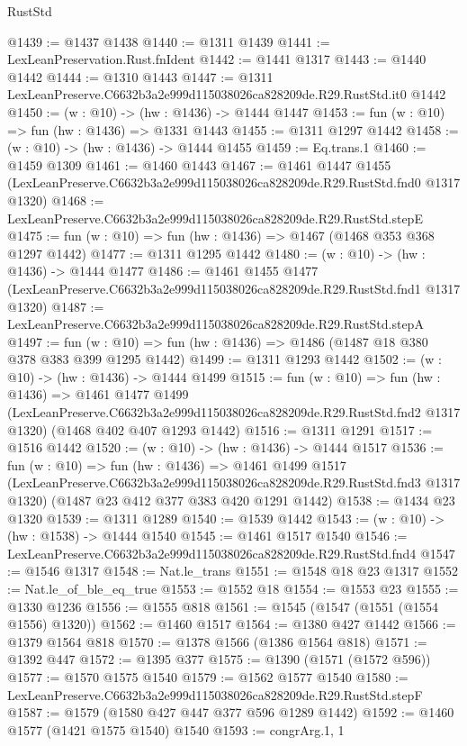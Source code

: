\begin{lexlean}{RustStd}
\begin{coremodule}
@1439 := @1437 @1438
@1440 := @1311 @1439
@1441 := LexLeanPreservation.Rust.fnIdent
@1442 := @1441 @1317
@1443 := @1440 @1442
@1444 := @1310 @1443
@1447 := @1311 LexLeanPreserve.C6632b3a2e999d115038026ca828209de.R29.RustStd.it0 @1442
@1450 := (w : @10) -> (hw : @1436) -> @1444 @1447
@1453 := fun (w : @10) => fun (hw : @1436) => @1331 @1443
@1455 := @1311 @1297 @1442
@1458 := (w : @10) -> (hw : @1436) -> @1444 @1455
@1459 := Eq.trans.{1}
@1460 := @1459 @1309
@1461 := @1460 @1443
@1467 := @1461
    @1447
    @1455
    (LexLeanPreserve.C6632b3a2e999d115038026ca828209de.R29.RustStd.fnd0 @1317 @1320)
@1468 := LexLeanPreserve.C6632b3a2e999d115038026ca828209de.R29.RustStd.stepE
@1475 := fun (w : @10) => fun (hw : @1436) => @1467 (@1468 @353 @368 @1297 @1442)
@1477 := @1311 @1295 @1442
@1480 := (w : @10) -> (hw : @1436) -> @1444 @1477
@1486 := @1461
    @1455
    @1477
    (LexLeanPreserve.C6632b3a2e999d115038026ca828209de.R29.RustStd.fnd1 @1317 @1320)
@1487 := LexLeanPreserve.C6632b3a2e999d115038026ca828209de.R29.RustStd.stepA
@1497 := fun (w : @10) => fun (hw : @1436) => @1486 (@1487 @18 @380 @378 @383 @399 @1295 @1442)
@1499 := @1311 @1293 @1442
@1502 := (w : @10) -> (hw : @1436) -> @1444 @1499
@1515 := fun (w : @10) =>
  fun (hw : @1436) =>
  @1461
    @1477
    @1499
    (LexLeanPreserve.C6632b3a2e999d115038026ca828209de.R29.RustStd.fnd2 @1317 @1320)
    (@1468 @402 @407 @1293 @1442)
@1516 := @1311 @1291
@1517 := @1516 @1442
@1520 := (w : @10) -> (hw : @1436) -> @1444 @1517
@1536 := fun (w : @10) =>
  fun (hw : @1436) =>
  @1461
    @1499
    @1517
    (LexLeanPreserve.C6632b3a2e999d115038026ca828209de.R29.RustStd.fnd3 @1317 @1320)
    (@1487 @23 @412 @377 @383 @420 @1291 @1442)
@1538 := @1434 @23 @1320
@1539 := @1311 @1289
@1540 := @1539 @1442
@1543 := (w : @10) -> (hw : @1538) -> @1444 @1540
@1545 := @1461 @1517 @1540
@1546 := LexLeanPreserve.C6632b3a2e999d115038026ca828209de.R29.RustStd.fnd4
@1547 := @1546 @1317
@1548 := Nat.le_trans
@1551 := @1548 @18 @23 @1317
@1552 := Nat.le_of_ble_eq_true
@1553 := @1552 @18
@1554 := @1553 @23
@1555 := @1330 @1236
@1556 := @1555 @818
@1561 := @1545 (@1547 (@1551 (@1554 @1556) @1320))
@1562 := @1460 @1517
@1564 := @1380 @427 @1442
@1566 := @1379 @1564 @818
@1570 := @1378 @1566 (@1386 @1564 @818)
@1571 := @1392 @447
@1572 := @1395 @377
@1575 := @1390 (@1571 (@1572 @596))
@1577 := @1570 @1575 @1540
@1579 := @1562 @1577 @1540
@1580 := LexLeanPreserve.C6632b3a2e999d115038026ca828209de.R29.RustStd.stepF
@1587 := @1579 (@1580 @427 @447 @377 @596 @1289 @1442)
@1592 := @1460 @1577 (@1421 @1575 @1540) @1540
@1593 := congrArg.{1, 1}

\end{coremodule}
\end{lexlean}
